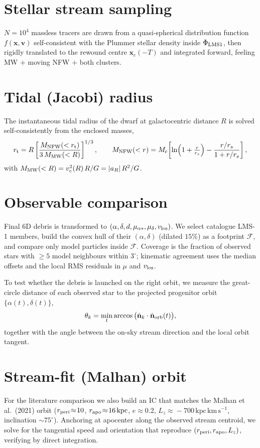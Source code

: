 \documentclass[11pt]{article}
\newcommand{\kpc}{\,\mathrm{kpc}}
\newcommand{\kms}{\,\mathrm{km\,s^{-1}}}
\begin{document}
\section{Stellar stream sampling}
$N=10^4$ massless tracers are drawn from a quasi-spherical distribution function
$f(\mathbf{x},\mathbf{v})$ self-consistent with the Plummer stellar density
inside $\Phi_{\rm LMS1}$, then rigidly translated to the rewound centre
$\mathbf{x}_c(-T)$ and integrated forward, feeling MW $+$ moving NFW $+$ both
clusters.

\section{Tidal (Jacobi) radius}
The instantaneous tidal radius of the dwarf at galactocentric distance $R$ is
solved self-consistently from the enclosed masses,
\begin{equation}
r_{\rm t}=R\left[\frac{M_{\rm NFW}(<r_{\rm t})}{3\,M_{\rm MW}(<R)}\right]^{1/3},
\qquad
M_{\rm NFW}(<r)=M_{\rm c}\!\left[\ln\!\Big(1+\tfrac{r}{r_s}\Big)-\frac{r/r_s}{1+r/r_s}\right],
\end{equation}
with $M_{\rm MW}(<R)=v_c^2(R)\,R/G=|a_R|\,R^2/G$.

\section{Observable comparison}
Final 6D debris is transformed to
$(\alpha,\delta,d,\mu_{\alpha\ast},\mu_\delta,v_{\rm los})$. We select catalogue
LMS-1 members, build the convex hull of their $(\alpha,\delta)$ (dilated $15\%$)
as a footprint $\mathcal{F}$, and compare only model particles inside
$\mathcal{F}$. Coverage is the fraction of observed stars with $\geq5$ model
neighbours within $3^\circ$; kinematic agreement uses the median offsets and the
local RMS residuals in $\mu$ and $v_{\rm los}$.

To test whether the debris is launched on the right orbit, we measure the
great-circle distance of each observed star to the projected progenitor orbit
$\{\alpha(t),\delta(t)\}$,
\begin{equation}
\theta_k=\min_t \arccos\big(\hat{\mathbf{n}}_k\cdot\hat{\mathbf{n}}_{\rm orb}(t)\big),
\end{equation}
together with the angle between the on-sky stream direction and the local orbit
tangent.

\section{Stream-fit (Malhan) orbit}
For the literature comparison we also build an IC that matches the
Malhan et al.~(2021) orbit ($r_{\rm peri}\!\approx\!10$,
$r_{\rm apo}\!\approx\!16\kpc$, $e\!\approx\!0.2$,
$L_z\!\approx\!-700\kpc\kms$, inclination $\sim75^\circ$). Anchoring at
apocenter along the observed stream centroid, we solve for the tangential speed
and orientation that reproduce $(r_{\rm peri},r_{\rm apo},L_z)$, verifying by
direct integration.
\end{document}
